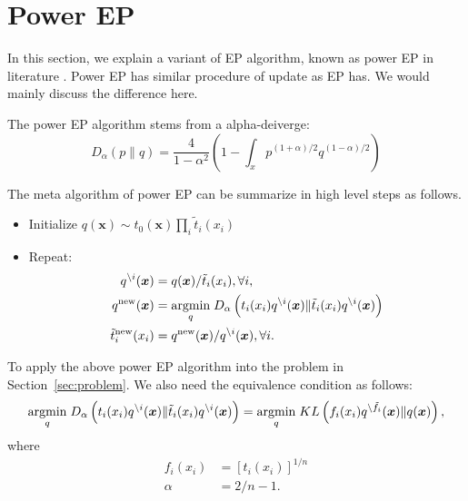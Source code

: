\documentclass{article}
\begin{document}
\section{Power EP}\label{sec:power-ep}
In this section, we explain a variant of EP algorithm, known as power EP in literature \cite{minka2004power}.
Power EP has similar procedure of update as EP has. We would mainly discuss the difference here.

The power EP algorithm stems from a alpha-deiverge:
\begin{equation}
  D_{\alpha}(p\|q) = \frac{4}{1-\alpha^2} \left( 1 - \int_x p^{(1+\alpha)/2} q^{(1-\alpha)/2} \right)
\end{equation}

The meta algorithm of power EP can be summarize in high level steps as follows.
\begin{itemize}
\item Initialize $q(\bm{x}) \sim t_0(\bm{x})\prod_{i}\tilde{t}_i(x_i)$
\item Repeat:
  \begin{align}
    q^{\backslash i}(\bm{x}) &= q(\bm{x})/\tilde{t}_i(x_i), \forall i,\\
    q^{\mathrm{new}}(\bm{x}) &= \underset{q}{\operatorname{argmin}}\; D_{\alpha}\left( t_i(x_i)q^{\backslash i}(\bm{x}) \| \tilde{t}_i(x_i)q^{\backslash i}(\bm{x}) \right) \\
    \tilde{t}^{\mathrm{new}}_{i}(x_i) &= q^{\mathrm{new}}(\bm{x})/q^{\backslash i}(\bm{x}), \forall i.
  \end{align}
\end{itemize}

To apply the above power EP algorithm into the problem in Section~\ref{sec:problem}. We also need the equivalence condition as follows:
\begin{equation}\label{eq:min_kl_eqv}
  \underset{q}{\operatorname{argmin}}\; D_{\alpha}\left( t_i(x_i)q^{\backslash i}(\bm{x}) \| \tilde{t}_i(x_i)q^{\backslash i}(\bm{x}) \right) = \underset{q}{\operatorname{argmin}}\; KL\left( f_i(x_i)q^{\backslash \tilde{f}_i}(\bm{x}) \| q(\bm{x}) \right),
\end{equation}
where
\begin{align}
  f_i(x_i) &= [t_i(x_i)]^{1/n} \\
  \alpha &= 2/n -1.  
\end{align}
\end{document}
